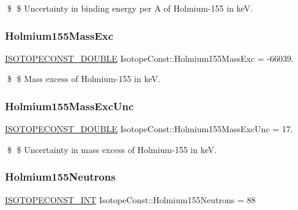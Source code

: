 \$ \$ Uncertainty in binding energy per A of Holmium-\/155 in keV. \mbox{\label{group___isotope_const-_holmium-_ho155_ga0bf0da7aa63f0deacce185ef864fb22e}} 
\subsubsection{\texorpdfstring{Holmium155\+Mass\+Exc}{Holmium155MassExc}}
{\footnotesize\ttfamily \mbox{\hyperlink{group___isotope_const-_macros_ga8f45a7272ce02c0b4c65c44636ed719a}{I\+S\+O\+T\+O\+P\+E\+C\+O\+N\+S\+T\+\_\+\+D\+O\+U\+B\+LE}} Isotope\+Const\+::\+Holmium155\+Mass\+Exc = -\/66039.}

\$ \$ Mass excess of Holmium-\/155 in keV. \mbox{\label{group___isotope_const-_holmium-_ho155_ga32fabf1523d8b2f82621372e462b1801}} 
\subsubsection{\texorpdfstring{Holmium155\+Mass\+Exc\+Unc}{Holmium155MassExcUnc}}
{\footnotesize\ttfamily \mbox{\hyperlink{group___isotope_const-_macros_ga8f45a7272ce02c0b4c65c44636ed719a}{I\+S\+O\+T\+O\+P\+E\+C\+O\+N\+S\+T\+\_\+\+D\+O\+U\+B\+LE}} Isotope\+Const\+::\+Holmium155\+Mass\+Exc\+Unc = 17.}

\$ \$ Uncertainty in mass excess of Holmium-\/155 in keV. \mbox{\label{group___isotope_const-_holmium-_ho155_ga18c85cd3653fa20063a7c86bca9be556}} 
\subsubsection{\texorpdfstring{Holmium155\+Neutrons}{Holmium155Neutrons}}
{\footnotesize\ttfamily \mbox{\hyperlink{group___isotope_const-_macros_ga5f18360b3e99483a35c32d789e62621c}{I\+S\+O\+T\+O\+P\+E\+C\+O\+N\+S\+T\+\_\+\+I\+NT}} Isotope\+Const\+::\+Holmium155\+Neutrons = 88}

